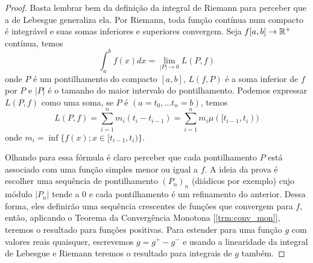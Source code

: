 \begin{problem}
    \label{prob:l3:2}
\end{problem}
\begin{proof}
    Basta lembrar bem da definição da integral de Riemann para perceber que a de Lebesgue generaliza ela.
    Por Riemann, toda função contínua num compacto é integrável e suas somas inferiores e superiores convergem. Seja $f[a,b] \rightarrow \mathbb{R}^+$ contínua, temos
    $$\int_a^b f(x) dx = \lim_{|P|\to 0} L(P,f)$$
    onde $P$ é um pontilhamento do compacto $[a,b]$, $L(f,P)$ é a soma inferior de $f$ por $P$ e $|P|$ é 
    o tamanho do maior intervalo do pontilhamento. Podemos expressar
    $L(P,f)$ como uma soma, se $P$ é $(a = t_0, \dots t_n = b)$, temos 
    $$L(P,f) = \sum_{i = 1}^{n} m_i (t_i - t_{i-1}) = \sum_{i = 1}^{n} m_i \mu([t_{i-1},t_i))$$
    onde $m_i = \inf\{f(x); x \in [t_{i-1}, t_{i})\}$.

    Olhando para essa fórmula é claro perceber que cada pontilhamento $P$ está associado com uma 
    função simples menor ou igual a $f$. A ideia da prova é escolher uma sequência de pontilhamento $(P_n)_n$ (diádicos por exemplo)
    cujo módulo $|P_n|$  tende a 0 e cada pontilhamento é um 
    refinamento do anterior. Dessa forma, eles definirão uma sequência crescentes de funções que convergem para $f$, então,  
    aplicando o Teorema da Convergência Monotona [\ref{trm:conv_mon}], teremos o resultado para funções positivas. Para estender 
    para uma função $g$ com valores reais quaisquer, escrevemos $g = g^+ - g^-$ e usando a linearidade da integral de Lebesgue e Riemann
    teremos o resultado para integrais de $g$ também.


\end{proof}
